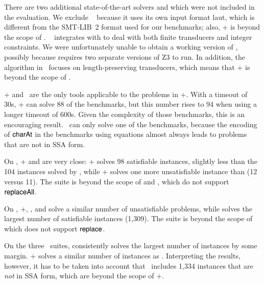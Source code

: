 There are two additional state-of-the-art solvers  {\slent} and {\trauplus} which were not included in
the evaluation. We exclude {\slent}~\cite{WC+18} because it uses its own input format laut, which is different from the SMT-LIB~2 format used for our
benchmarks; also, {\transducerbench+} is beyond the scope of {\slent}.
%
{\trauplus}~\cite{AbdullaA+19}  integrates {\trau} with {\sloth} to deal with both finite transducers and integer constraints. We were unfortunately unable
to obtain a working version of {\trauplus}, possibly because {\trau} requires two separate versions of Z3 to run. In addition, the algorithm in~\cite{AbdullaA+19} focuses on length-preserving transducers, which means that {\transducerbench}+ is beyond the scope of \trauplus.
 
{\ostrich}+ and \ostrich\ are the only tools applicable to the
problems in {\transducerbench}+. With a timeout of 30s, \ostrich+ can
solve 88 of the benchmarks, but this number rises to 94 when using a
longer timeout of 600s. Given the complexity of those benchmarks, this
is an encouraging result. \ostrich\ can only solve one of the
benchmarks, because the encoding of $\mathsf{charAt}$ in the benchmarks using
equations almost always leads to problems that are not in SSA form.

On {\slogbenchra}, {\ostrich}+ and {\cvc} are very close: {\ostrich}+ solves 98 satisfiable instances, slightly less than the 104 instances solved by {\cvc}, while {\ostrich}+ solves one more unsatisfiable instance than {\cvc} (12 versus 11). The suite is beyond the scope of {\zthree} and {\zthreetrau}, which do not support $\mathsf{replaceAll}$.

On {\slogbenchr}, {\ostrich}+, {\cvc}, and {\zthree} solve a similar
number of unsatisfiable problems, while {\cvc} solves the largest
number of satisfiable instances (1,309). The  suite %
is beyond the scope of {\zthreetrau} which does not support
$\mathsf{replace}$.

On the three \pyexbench\ suites, {\zthreetrau} consistently solves the
largest number of instances by some margin. \ostrich+ solves a similar
number of instances as \zthree. Interpreting the results, however, it
has to be taken into account that \pyexbench\  includes 1,334  instances
that are \emph{not} in SSA form, which are beyond the scope of
\ostrich+.

